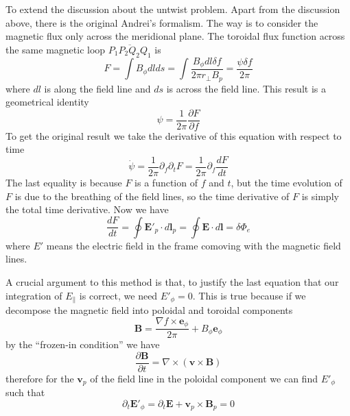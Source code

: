 \documentclass[letterpaper, 11pt]{article}
\numberwithin{equation}{section}
\numberwithin{figure}{section}
\begin{document}
To extend the discussion about the untwist problem. Apart from the discussion above, there is the original Andrei's formalism. The way is to consider the magnetic flux only across the meridional plane. The toroidal flux function across the same magnetic loop $\overline{P_1P_2Q_2Q_1}$ is
\begin{equation}
    \label{eq:12}
    F = \int B_{\phi}dl ds = \int \frac{B_{\phi}dl\delta f}{2\pi r_{\perp}B_{p}} = \frac{\psi \delta f}{2\pi}
\end{equation}
where $dl$ is along the field line and $ds$ is across the field line. This result is a geometrical identity
\begin{equation}
    \label{eq:13}
    \psi = \frac{1}{2\pi}\frac{\partial F}{\partial f}
\end{equation}
To get the original result we take the derivative of this equation with respect to time
\begin{equation}
    \label{eq:14}
    \dot{\psi} = \frac{1}{2\pi}\partial_f\partial_tF = \frac{1}{2\pi}\partial_f\frac{dF}{dt} 
\end{equation}
The last equality is because $F$ is a function of $f$ and $t$, but the time evolution of $F$ is due to the breathing of the field lines, so the time derivative of $F$ is simply the total time derivative. Now we have
\begin{equation}
    \label{eq:15}
    \frac{dF}{dt} = \oint \boldsymbol{E}'_p\cdot d\boldsymbol{l}_p = \oint \boldsymbol{E}\cdot d\boldsymbol{l} = \delta\Phi_e
\end{equation}
where $E'$ means the electric field in the frame comoving with the magnetic field lines.

A crucial argument to this method is that, to justify the last equation that our integration of $E_{\parallel}$ is correct, we need $E'_{\phi} = 0$. This is true because if we decompose the magnetic field into poloidal and toroidal components
\begin{equation}
    \label{eq:16}
    \boldsymbol{B} = \frac{\nabla f\times \boldsymbol{e}_{\phi}}{2\pi} + B_{\phi}\boldsymbol{e}_{\phi}
\end{equation}
by the ``frozen-in condition'' we have
\begin{equation}
    \label{eq:17}
    \frac{\partial \boldsymbol{B}}{\partial t} = \nabla\times(\boldsymbol{v}\times \boldsymbol{B})
\end{equation}
therefore for the $\boldsymbol{v}_p$ of the field line in the poloidal component we can find $E'_{\phi}$ such that
\begin{equation}
    \label{eq:18}
    \partial_t\boldsymbol{E}'_{\phi} = \partial_t\boldsymbol{E} + \boldsymbol{v}_p\times \boldsymbol{B}_p = 0
\end{equation}
\end{document}
